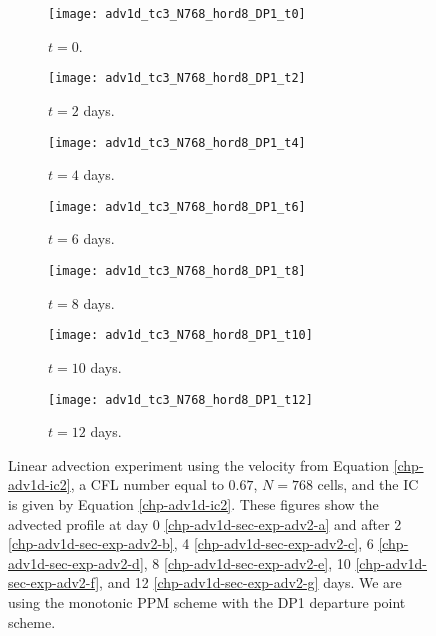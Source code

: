 \begin{figure}[!htb]
	\centering
	\begin{subfigure}{0.3\textwidth}
		\centering
		\texttt{[image: adv1d\_tc3\_N768\_hord8\_DP1\_t0]}
		\caption{$t=0$.\label{chp-adv1d-sec-exp-adv2-a}}
	\end{subfigure}
	\begin{subfigure}{0.3\textwidth}
		\centering
		\texttt{[image: adv1d\_tc3\_N768\_hord8\_DP1\_t2]}
		\caption{$t=2$ days.\label{chp-adv1d-sec-exp-adv2-b}}
	\end{subfigure}
	\begin{subfigure}{0.3\textwidth}
		\centering
		\texttt{[image: adv1d\_tc3\_N768\_hord8\_DP1\_t4]}
		\caption{$t=4$ days.\label{chp-adv1d-sec-exp-adv2-c}}
	\end{subfigure}
	
	\begin{subfigure}{0.3\textwidth}
		\centering
		\texttt{[image: adv1d\_tc3\_N768\_hord8\_DP1\_t6]}
		\caption{$t=6$ days.\label{chp-adv1d-sec-exp-adv2-d}}
	\end{subfigure}
	\begin{subfigure}{0.3\textwidth}
		\centering
		\texttt{[image: adv1d\_tc3\_N768\_hord8\_DP1\_t8]}
		\caption{$t=8$ days.\label{chp-adv1d-sec-exp-adv2-e}}
	\end{subfigure}
	\begin{subfigure}{0.3\textwidth}
		\centering
		\texttt{[image: adv1d\_tc3\_N768\_hord8\_DP1\_t10]}
		\caption{$t=10$ days.\label{chp-adv1d-sec-exp-adv2-f}}
	\end{subfigure}

	\begin{subfigure}{0.3\textwidth}
		\centering
		\texttt{[image: adv1d\_tc3\_N768\_hord8\_DP1\_t12]}
		\caption{$t=12$ days.\label{chp-adv1d-sec-exp-adv2-g}}
	\end{subfigure}
	\caption{Linear advection experiment using the velocity from Equation \eqref{chp-adv1d-ic2},
		a CFL number equal to $0.67$, $N=768$ cells, and the IC is given by 
		Equation \eqref{chp-adv1d-ic2}.
		These figures show the advected profile at
		day 0  \eqref{chp-adv1d-sec-exp-adv2-a} and after
		2 \eqref{chp-adv1d-sec-exp-adv2-b}, 
		4  \eqref{chp-adv1d-sec-exp-adv2-c},
		6  \eqref{chp-adv1d-sec-exp-adv2-d},
		8  \eqref{chp-adv1d-sec-exp-adv2-e},
		10  \eqref{chp-adv1d-sec-exp-adv2-f},
		and 12  \eqref{chp-adv1d-sec-exp-adv2-g} days.
		We are using the monotonic PPM scheme with the DP1 departure point scheme. \label{chp-adv1d-sec-exp-adv2}}
\end{figure}
